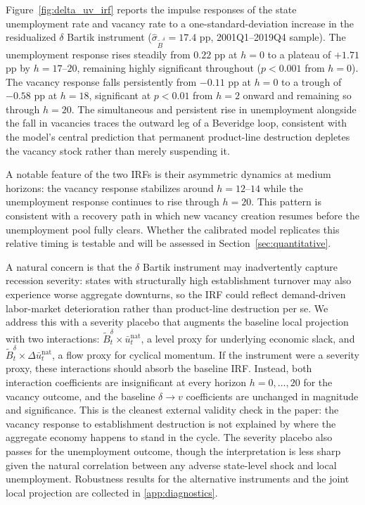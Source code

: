 \documentclass[authoryear, review, 12pt]{elsarticle}
\begin{document}

	Figure~\ref{fig:delta_uv_irf} reports the impulse responses of the
	state unemployment rate and vacancy rate to a one-standard-deviation
	increase in the residualized $\delta$ Bartik instrument
	($\hat{\sigma}_{\tilde{B}^\delta} = 17.4$ pp, 2001Q1--2019Q4 sample).
	The unemployment response rises steadily from $0.22$ pp at $h=0$ to
	a plateau of $+1.71$ pp by $h=17$--$20$, remaining highly significant
	throughout ($p < 0.001$ from $h=0$).  The vacancy response falls
	persistently from $-0.11$ pp at $h=0$ to a trough of $-0.58$ pp at
	$h=18$, significant at $p < 0.01$ from $h=2$ onward and remaining so
	through $h=20$.  The simultaneous and persistent rise in unemployment
	alongside the fall in vacancies traces the outward leg of a Beveridge
	loop, consistent with the model's central prediction that permanent
	product-line destruction depletes the vacancy stock rather than merely
	suspending it.

	A notable feature of the two IRFs is their asymmetric dynamics at
	medium horizons: the vacancy response stabilizes around $h = 12$--$14$
	while the unemployment response continues to rise through $h = 20$.
	This pattern is consistent with a recovery path in which new vacancy
	creation resumes before the unemployment pool fully clears.  Whether the
	calibrated model replicates this relative timing is testable and will
	be assessed in Section~\ref{sec:quantitative}.


	A natural concern is that the $\delta$ Bartik instrument may inadvertently
	capture recession severity: states with structurally high establishment turnover
	may also experience worse aggregate downturns, so the IRF could reflect
	demand-driven labor-market deterioration rather than product-line destruction
	per se.  We address this with a severity placebo that augments the baseline
	local projection with two interactions: $\tilde{B}_t^\delta \times
	\bar{u}_t^{\text{nat}}$, a level proxy for underlying economic slack, and
	$\tilde{B}_t^\delta \times \Delta\bar{u}_t^{\text{nat}}$, a flow proxy for
	cyclical momentum.  If the instrument were a severity proxy, these interactions
	should absorb the baseline IRF.  Instead, both interaction coefficients are
	insignificant at every horizon $h = 0, \ldots, 20$ for the vacancy outcome, and
	the baseline $\delta \to v$ coefficients are unchanged in magnitude and
	significance.  This is the cleanest external validity check in the paper: the
	vacancy response to establishment destruction is not explained by where
	the aggregate economy happens to stand in the cycle.  The severity placebo
	also passes for the unemployment outcome, though the interpretation is less
	sharp given the natural correlation between any adverse state-level shock and
	local unemployment.  Robustness results for the alternative instruments and
	the joint local projection are collected in
\ref{app:diagnostics}.
\end{document}
